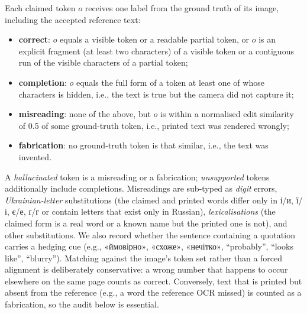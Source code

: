 \documentclass[pdflatex,sn-mathphys-num]{sn-jnl}%
\theoremstyle{thmstyleone}%
\theoremstyle{thmstyletwo}%
\theoremstyle{thmstylethree}%
\begin{document}
Each claimed token $o$ receives one label from the ground truth of its image, including the accepted reference text:
\begin{itemize}
\item \textbf{correct}: $o$ equals a visible token or a readable partial token, or $o$ is an explicit fragment (at least two characters) of a visible token or a contiguous run of the visible characters of a partial token;
\item \textbf{completion}: $o$ equals the full form of a token at least one of whose characters is hidden, i.e., the text is true but the camera did not capture it;
\item \textbf{misreading}: none of the above, but $o$ is within a normalised edit similarity of 0.5 of some ground-truth token, i.e., printed text was rendered wrongly;
\item \textbf{fabrication}: no ground-truth token is that similar, i.e., the text was invented.
\end{itemize}
A \emph{hallucinated} token is a misreading or a fabrication; \emph{unsupported} tokens additionally include completions. Misreadings are sub-typed as \emph{digit} errors, \emph{Ukrainian-letter} substitutions (the claimed and printed words differ only in \foreignlanguage{ukrainian}{і/и, ї/і, є/е, ґ/г} or contain letters that exist only in Russian), \emph{lexicalisations} (the claimed form is a real word or a known name but the printed one is not), and other substitutions. We also record whether the sentence containing a quotation carries a hedging cue (e.g., \foreignlanguage{ukrainian}{«ймовірно»}, \foreignlanguage{ukrainian}{«схоже»}, \foreignlanguage{ukrainian}{«нечітко»}, ``probably'', ``looks like'', ``blurry''). Matching against the image's token set rather than a forced alignment is deliberately conservative: a wrong number that happens to occur elsewhere on the same page counts as correct. Conversely, text that is printed but absent from the reference (e.g., a word the reference OCR missed) is counted as a fabrication, so the audit below is essential.
\end{document}
